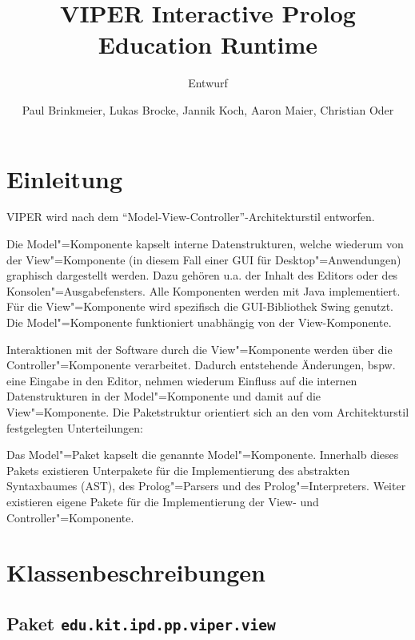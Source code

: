 \documentclass[parskip=full,11pt,twoside]{scrartcl}
\title{VIPER Interactive Prolog Education Runtime}
\subtitle{Entwurf}
\author{Paul Brinkmeier, Lukas Brocke, Jannik Koch, Aaron Maier, Christian Oder}
\begin{document}
\maketitle

\section{Einleitung}

VIPER wird nach dem \enquote{Model-View-Controller}-Architekturstil entworfen.

Die Model"=Komponente kapselt interne Datenstrukturen, welche wiederum von der View"=Komponente (in diesem Fall einer GUI für Desktop"=Anwendungen) graphisch dargestellt werden. Dazu gehören u.a. der Inhalt des Editors oder des Konsolen"=Ausgabefensters. Alle Komponenten werden mit Java implementiert. Für die View"=Komponente wird spezifisch die GUI-Bibliothek Swing genutzt. Die Model"=Komponente funktioniert unabhängig von der View-Komponente.

Interaktionen mit der Software durch die View"=Komponente werden über die Controller"=Komponente verarbeitet. Dadurch entstehende Änderungen, bspw. eine Eingabe in den Editor, nehmen wiederum Einfluss auf die internen Datenstrukturen in der Model"=Komponente und damit auf die View"=Komponente. Die Paketstruktur orientiert sich an den vom Architekturstil festgelegten Unterteilungen:\\

\begin{center}
	\begin{minipage}{0.4\textwidth}%
	\end{minipage}
\end{center}

Das Model"=Paket kapselt die genannte Model"=Komponente. Innerhalb dieses Pakets existieren Unterpakete für die Implementierung des abstrakten Syntaxbaumes (AST), des Prolog"=Parsers und des Prolog"=Interpreters. Weiter existieren eigene Pakete für die Implementierung der View- und Controller"=Komponente.

\section{Klassenbeschreibungen}

\subsection{Paket \texttt{edu.kit.ipd.pp.viper.view}}
\end{document}
